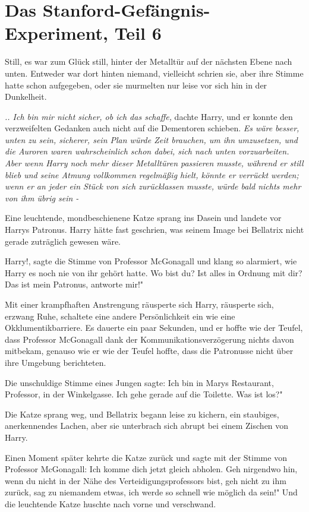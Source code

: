 \chapter{Das Stanford-Gefängnis-Experiment, Teil 6}

Still, es war zum Glück still, hinter der Metalltür auf der nächsten Ebene nach
unten. Entweder war dort hinten niemand, vielleicht schrien sie, aber ihre
Stimme hatte schon aufgegeben, oder sie murmelten nur leise vor sich hin in der
Dunkelheit.

\emph{.. Ich bin mir nicht sicher, ob ich das schaffe,} dachte Harry, und er
konnte den verzweifelten Gedanken auch nicht auf die Dementoren schieben.
\emph{Es wäre besser, unten zu sein, sicherer, sein Plan würde Zeit brauchen, um
ihn umzusetzen, und die Auroren waren wahrscheinlich schon dabei, sich nach
unten vorzuarbeiten. Aber wenn Harry noch mehr dieser Metalltüren passieren
musste, während er still blieb und seine Atmung vollkommen regelmäßig hielt,
könnte er verrückt werden; wenn er an jeder ein Stück von sich zurücklassen
musste, würde bald nichts mehr von ihm übrig sein - }

Eine leuchtende, mondbeschienene Katze sprang ins Dasein und landete vor Harrys
Patronus. Harry hätte fast geschrien, was seinem Image bei Bellatrix nicht
gerade zuträglich gewesen wäre.

\glqq Harry!\grqq{}, sagte die Stimme von Professor McGonagall und klang so
alarmiert, wie Harry es noch nie von ihr gehört hatte. \glqq Wo bist du? Ist
alles in Ordnung mit dir? Das ist mein Patronus, antworte mir!"

Mit einer krampfhaften Anstrengung räusperte sich Harry, räusperte sich, erzwang
Ruhe, schaltete eine andere Persönlichkeit ein wie eine Okklumentikbarriere. Es
dauerte ein paar Sekunden, und er hoffte wie der Teufel, dass Professor
McGonagall dank der Kommunikationsverzögerung nichts davon mitbekam, genauso wie
er wie der Teufel hoffte, dass die Patronusse nicht über ihre Umgebung
berichteten.

Die unschuldige Stimme eines Jungen sagte: \glqq Ich bin in Marys Restaurant,
Professor, in der Winkelgasse. Ich gehe gerade auf die Toilette. Was ist los?"

Die Katze sprang weg, und Bellatrix begann leise zu kichern, ein staubiges,
anerkennendes Lachen, aber sie unterbrach sich abrupt bei einem Zischen von
Harry.

Einen Moment später kehrte die Katze zurück und sagte mit der Stimme von
Professor McGonagall: \glqq Ich komme dich jetzt gleich abholen. Geh nirgendwo
hin, wenn du nicht in der Nähe des Verteidigungsprofessors bist, geh nicht zu
ihm zurück, sag zu niemandem etwas, ich werde so schnell wie möglich da sein!"
Und die leuchtende Katze huschte nach vorne und verschwand.

